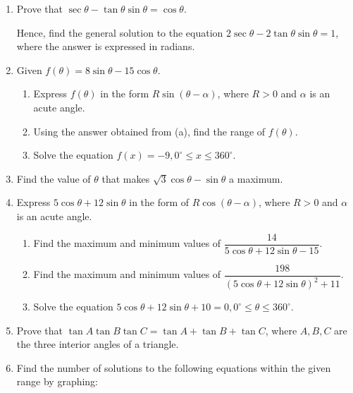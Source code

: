 \documentclass{report}
\begin{document}
\begin{enumerate}
	\item Prove that $\sec \theta - \tan \theta \sin \theta = \cos \theta$.
	      
	      Hence, find the general solution to the equation $2 \sec \theta - 2 \tan \theta \sin \theta = 1$, where the answer is expressed in radians.
	      
	\item Given $f(\theta) = 8 \sin \theta - 15 \cos \theta$.
	      
	      \begin{enumerate}
	      	\item Express $f(\theta)$ in the form $R \sin (\theta - \alpha)$, where $R > 0$ and $\alpha$ is an acute angle.
	      	          
	      	\item Using the answer obtained from (a), find the range of $f(\theta)$.
	      	          
	      	\item Solve the equation $f(x) = -9, 0^{\circ} \leq x \leq 360^{\circ}$.
	      \end{enumerate}
	      
	\item Find the value of $\theta$ that makes $\sqrt{3} \cos \theta - \sin \theta$ a maximum.
	      
	\item Express $5 \cos \theta + 12 \sin \theta$ in the form of $R \cos (\theta - \alpha)$, where $R > 0$ and $\alpha$ is an acute angle.
	      
	      \begin{enumerate}
	      	\item Find the maximum and minimum values of $\dfrac{14}{5 \cos \theta + 12 \sin \theta - 15}$.
	      	          
	      	\item Find the maximum and minimum values of $\dfrac{198}{(5 \cos \theta + 12 \sin \theta)^2 + 11}$.
	      	          
	      	\item Solve the equation $5 \cos \theta + 12 \sin \theta + 10 = 0, 0^{\circ} \leq \theta \leq 360^{\circ}$.
	      \end{enumerate}
	      
	\item Prove that $\tan A \tan B \tan C = \tan A + \tan B + \tan C$, where $A, B, C$ are the three interior angles of a triangle.
	      
	\item Find the number of solutions to the following equations within the given range by graphing:
	      

\end{enumerate}
\end{document}
